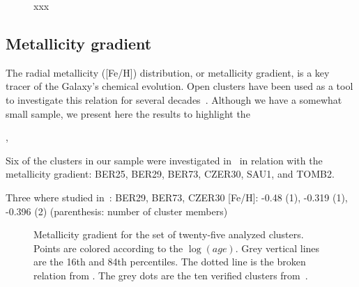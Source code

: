 \documentclass[draft]{aa}
\begin{document}
  \begin{figure}
   \caption{xxx}
   \label{fig:MWmap_vectors}
  \end{figure}






 \subsection{Metallicity gradient}
  \label{ssec:met_gradient}

  The radial metallicity ([Fe/H]) distribution, or metallicity gradient, is a
  key tracer of the Galaxy's chemical evolution. Open clusters have been used as
  a tool to investigate this relation for several decades~\citep{Janes_1979}.
  Although we have a somewhat small sample, we present here the results to
  highlight the 

  \cite{Donor_2020}, 

  Six of the clusters in our sample were investigated in~\cite{Netopil_2021} in
  relation with the metallicity gradient: BER25, BER29, BER73, CZER30, SAU1,
  and TOMB2.

  Three where studied in~\cite{Spina_2021}: BER29, BER73, CZER30
  [Fe/H]: -0.48 (1), -0.319 (1), -0.396 (2)
  (parenthesis: number of cluster members)


  \begin{figure}
   \caption{Metallicity gradient for the set of twenty-five analyzed clusters.
   Points are colored according to the $\log(age)$. Grey vertical lines are the
   16th and 84th percentiles. The dotted line is the broken relation from 
   \citet[][Fig 7]{Donor_2020}. The grey dots are the ten verified clusters
   from~\cite{Perren_2020}.}
   \label{fig:met_gradient}
  \end{figure}
\end{document}
